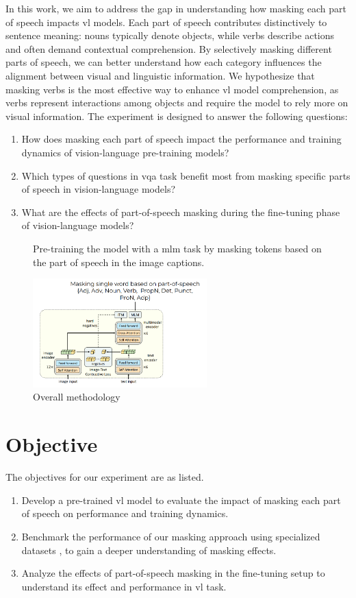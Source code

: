 In this work, we aim to address the gap in understanding how masking each part of speech impacts \acrshort{vl} models.
Each part of speech contributes distinctively to sentence meaning: nouns typically denote objects, while verbs describe actions and often demand contextual comprehension.
By selectively masking different parts of speech, we can better understand how each category influences the alignment between visual and linguistic information.
We hypothesize that masking verbs is the most effective way to enhance \acrshort{vl} model comprehension, as verbs represent interactions among objects and require the model to rely more on visual information.
The experiment is designed to answer the following questions:
\begin{enumerate}
    \item How does masking each part of speech impact the performance and training dynamics of vision-language pre-training models?
    \item Which types of questions in \acrfull{vqa} task benefit most from masking specific parts of speech in vision-language models?
    \item What are the effects of part-of-speech masking during the fine-tuning phase of vision-language models?
\end{enumerate}

\begin{figure}[h]
    \caption{Overall methodology}
    \label{fig:overview}
    Pre-training the model with a \acrshort{mlm} task by masking tokens based on the part of speech in the image captions.
    \begin{center}
        \includegraphics[width=0.6\textwidth]{Images/overview.png}
    \end{center}
    \small
\end{figure}

\section{Objective}
The objectives for our experiment are as listed.
\begin{enumerate}
    \item Develop a pre-trained \acrshort{vl} model to evaluate the impact of masking each part of speech on performance and training dynamics.
    \item Benchmark the performance of our masking approach using specialized datasets \cite{valse, foil-dataset}, to gain a deeper understanding of masking effects.
    \item Analyze the effects of part-of-speech masking in the fine-tuning setup to understand its effect and performance in \acrshort{vl} task.
\end{enumerate}

